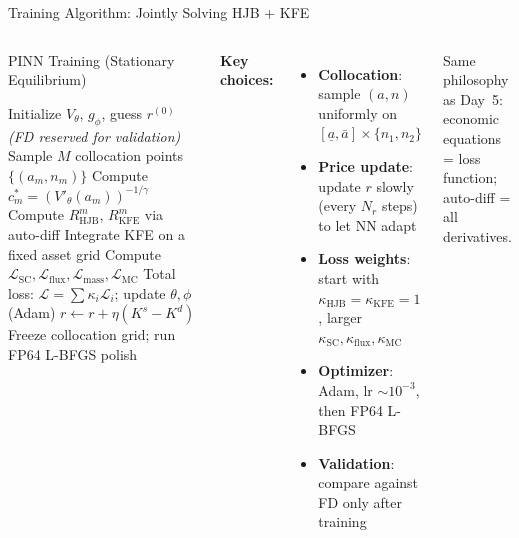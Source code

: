 \documentclass[aspectratio=169,11pt]{beamer}
\newcommand{\emphc}[1]{\textcolor{harvardcrimson}{#1}}
\newcommand{\ubar}[1]{\underline{#1}}
\begin{document}
\begin{frame}{Training Algorithm: Jointly Solving HJB + KFE}
\begin{columns}[T]
\begin{block}{PINN Training (Stationary Equilibrium)}
\footnotesize
\setlength{\itemsep}{0pt}
\begin{algorithmic}[1]
\STATE Initialize $V_\theta$, $g_\phi$, guess $r^{(0)}$ \;\;\textit{(FD reserved for validation)}
    \STATE Sample $M$ collocation points $\{(a_m, n_m)\}$
    \STATE Compute $c_m^* = (V'_\theta(a_m))^{-1/\gamma}$
    \STATE Compute $R_{\text{HJB}}^m$, $R_{\text{KFE}}^m$ via auto-diff
    \STATE Integrate KFE on a fixed asset grid
    \STATE Compute $\mathcal{L}_{\text{SC}}, \mathcal{L}_{\text{flux}}, \mathcal{L}_{\text{mass}}, \mathcal{L}_{\text{MC}}$
    \STATE Total loss: $\mathcal{L} = \sum \kappa_i \mathcal{L}_i$;\; update $\theta,\phi$ (Adam)
        \STATE $r \leftarrow r + \eta(K^s - K^d)$
    \ENDIF
\ENDFOR
\STATE Freeze collocation grid; run FP64 L-BFGS polish
\end{algorithmic}
\end{block}

\footnotesize
\textbf{Key choices:}
\begin{itemize}\itemsep0pt
    \item \textbf{Collocation}: sample $(a,n)$ uniformly on $[\ubar{a}, \bar{a}] \times \{n_1, n_2\}$
    \item \textbf{Price update}: update $r$ slowly (every $N_r$ steps) to let NN adapt
    \item \textbf{Loss weights}: start with $\kappa_{\text{HJB}}=\kappa_{\text{KFE}}=1$, larger $\kappa_{\text{SC}},\kappa_{\text{flux}},\kappa_{\text{MC}}$
    \item \textbf{Optimizer}: Adam, lr $\sim 10^{-3}$, then FP64 L-BFGS
    \item \textbf{Validation}: compare against FD only after training
\end{itemize}

\vspace{0.15em}
\begin{center}
\colorbox{uzhgreylight}{\parbox{0.95\columnwidth}{\centering\scriptsize
Same philosophy as Day~5: \emphc{economic equations = loss function};
\emphc{auto-diff = all derivatives}.}}
\end{center}
\end{columns}
\end{frame}
\end{document}
